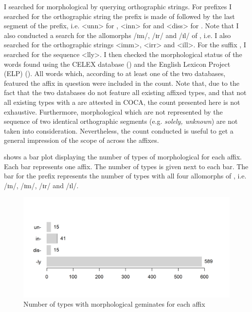 I searched for morphological  by querying orthographic strings. For prefixes I searched for the orthographic string the prefix is made of followed by the last segment of the prefix, i.e. <unn> for ,  <inn> for  and  <diss> for . Note that I also conducted a search for the allomorphs /ɪm/, /ɪr/ and /ɪl/ of , i.e. I also searched for the orthographic strings  <imm>, <irr> and <ill>.  For the suffix , I searched for the sequence <lly>.  I then checked the morphological status of the words found using the {CELEX} database (\citealt{Baayen.1995}) and the {English Lexicon Project (ELP)} (\citealt{Balota.2007}). All words which, according to at least one of the two databases, featured the affix in question were included in the count. 
Note that, due to the fact that the two databases do not feature all existing affixed types, and that not all existing types with a  are attested in  {COCA}, the count presented here is not exhaustive. Furthermore, morphological  which are not represented by the sequence of two identical orthographic segments (e.g. \textit{solely, unknown}) are not taken into consideration. Nevertheless, the count conducted is useful to get a general impression of the scope of  across the affixes.
 
  shows a bar plot displaying the number of types of morphological  for each affix. Each bar represents one affix. The number of types is given next to each bar. The bar for the prefix   represents the number of types with all four allomorphs of , i.e. /ɪn/, /ɪm/, /ɪr/ and /ɪl/. 
 
\begin{figure}  
	
	\includegraphics[scale=0.75]{images/Theory/NumberOfMorphGemAffixes.png}
 
	\caption{ Number of types with morphological geminates for each affix}
	\label{fig:morphological geminates for each affix}
\end{figure}

